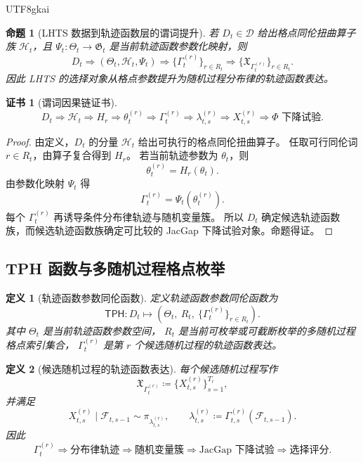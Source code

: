 \documentclass[12pt]{article}
\newtheorem{definition}{定义}[section]
\newtheorem{proposition}{命题}[section]
\newtheorem{Certificate}{证书}[section]
\newcommand{\TPH}{\ensuremath{\mathsf{TPH}}}
\newcommand{\DefEq}{\coloneqq}
\newcommand{\Fil}{\mathcal F}
\begin{document}
\begin{CJK*}{UTF8}{gkai}
\begin{proposition}[LHTS 数据到轨迹函数层的谓词提升]
若 \(D_t\in\mathcal D\) 给出格点同伦扭曲算子族 \(\mathcal H_t\)，且
\(\Psi_t:\Theta_t\to\mathfrak G_t\) 是当前轨迹函数参数化映射，则
\[
D_t
\Longrightarrow
(\Theta_t,\mathcal H_t,\Psi_t)
\Longrightarrow
\{\Gamma_t^{(r)}\}_{r\in R_t}
\Longrightarrow
\{\mathfrak X_{\Gamma_t^{(r)}}\}_{r\in R_t}.
\]
因此 LHTS 的选择对象从格点参数提升为随机过程分布律的轨迹函数表达。
\end{proposition}

\begin{Certificate}[谓词因果链证书]
\[
\boxed{
D_t
\Rightarrow
\mathcal H_t
\Rightarrow
H_r
\Rightarrow
\theta_t^{(r)}
\Rightarrow
\Gamma_t^{(r)}
\Rightarrow
\lambda_{t,s}^{(r)}
\Rightarrow
X_{t,s}^{(r)}
\Rightarrow
\Phi\text{ 下降试验}.
}
\]
\end{Certificate}

\begin{proof}
由定义，\(D_t\) 的分量 \(\mathcal H_t\) 给出可执行的格点同伦扭曲算子。
任取可行同伦词 \(r\in R_t\)，由算子复合得到 \(H_r\)。
若当前轨迹参数为 \(\theta_t\)，则
\[
\theta_t^{(r)}=H_r(\theta_t).
\]
由参数化映射 \(\Psi_t\) 得
\[
\Gamma_t^{(r)}=\Psi_t(\theta_t^{(r)}).
\]
每个 \(\Gamma_t^{(r)}\) 再诱导条件分布律轨迹与随机变量簇。
所以 \(D_t\) 确定候选轨迹函数族，而候选轨迹函数族确定可比较的
JacGap 下降试验对象。命题得证。
\end{proof}

\subsection{TPH 函数与多随机过程格点枚举}
\label{subsec:tph-enumeration}

\begin{definition}[轨迹函数参数同伦函数]
定义轨迹函数参数同伦函数为
\[
\boxed{
\TPH:
D_t
\longmapsto
\left(
\Theta_t,\ R_t,\ \{\Gamma_t^{(r)}\}_{r\in R_t}
\right).
}
\]
其中 \(\Theta_t\) 是当前轨迹函数参数空间，
\(R_t\) 是当前可枚举或可截断枚举的多随机过程格点索引集合，
\(\Gamma_t^{(r)}\) 是第 \(r\) 个候选随机过程的轨迹函数表达。
\end{definition}

\begin{definition}[候选随机过程的轨迹函数表达]
每个候选随机过程写作
\[
\mathfrak X_{\Gamma_t^{(r)}}
\DefEq
\{X_{t,s}^{(r)}\}_{s=1}^{T_r},
\]
并满足
\[
X_{t,s}^{(r)}
\mid
\Fil_{t,s-1}
\sim
\pi_{\lambda_{t,s}^{(r)}},
\qquad
\lambda_{t,s}^{(r)}
\DefEq
\Gamma_{t,s}^{(r)}(\Fil_{t,s-1}).
\]
因此
\[
\boxed{
\Gamma_t^{(r)}
\Longrightarrow
\text{分布律轨迹}
\Longrightarrow
\text{随机变量簇}
\Longrightarrow
\text{JacGap 下降试验}
\Longrightarrow
\text{选择评分}.
}
\]
\end{definition}


\end{CJK*}
\end{document}
